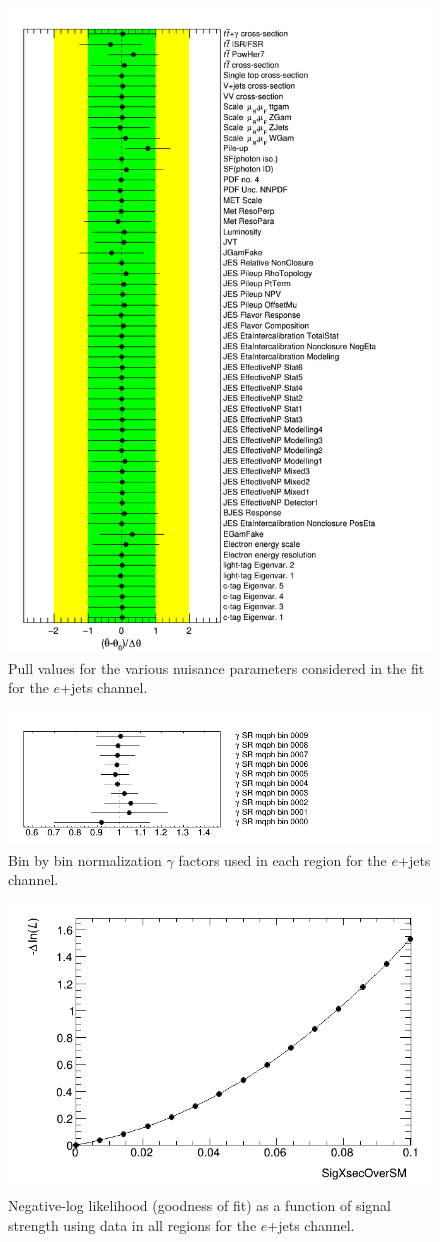 \begin{figure}[h!]
	\centering
	\includegraphics[width=.5\columnwidth]{../ThesisImages/RegionPlots/FinalRegions/Systematics/MQGamEJetPHptMJet/FCNC_All_ejets/NuisPar.png}
	\caption{Pull values for the various nuisance parameters considered in the fit for the $e$+jets channel.}
	\label{fig:NPejets}
\end{figure}

\begin{figure}[h!]
	\centering
	\includegraphics[width=.5\columnwidth]{../ThesisImages/RegionPlots/FinalRegions/Systematics/MQGamEJetPHptMJet/FCNC_All_ejets/Gammas.png}
	\caption{Bin by bin normalization $\gamma$ factors used in each region for the $e$+jets channel.}
	\label{fig:Gammasejets}
\end{figure}

\begin{figure}[h!]
	\centering
	\includegraphics[width=.5\columnwidth]{../ThesisImages/RegionPlots/FinalRegions/Systematics/MQGamEJetPHptMJet/FCNC_All_ejets/LHoodPlots/NLLscan_SigXsecOverSM.png}
	\caption{Negative-log likelihood (goodness of fit) as a function of signal strength using data in all regions for the $e$+jets channel.}
	\label{fig:NLLejets}
\end{figure}

